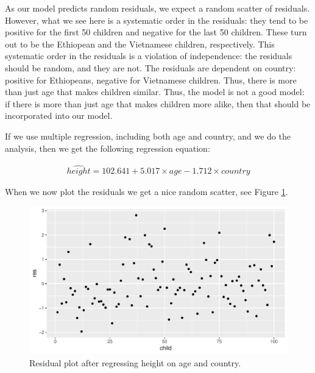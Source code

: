 \documentclass[]{book}\usepackage[]{graphicx}\usepackage[]{color}
\makeatletter
\def\maxwidth{ %
  \ifdim\Gin@nat@width>\linewidth
    \linewidth
  \else
    \Gin@nat@width
  \fi
}
\newenvironment{knitrout}{}{} %
\makeatother
\begin{document}
As our model predicts random residuals, we expect a random scatter of residuals. However, what we see here is a systematic order in the residuals: they tend to be positive for the first 50 children and negative for the last 50 children. These turn out to be the Ethiopean and the Vietnamese children, respectively. This systematic order in the residuals is a violation of independence: the residuals should be random, and they are not. The residuals are dependent on country: positive for Ethiopeans, negative for Vietnamese children. Thus, there is more than just age that makes children similar. Thus, the model is not a good model: if there is more than just age that makes children more alike, then that should be incorporated into our model. 

If we use multiple regression, including both age and country, and we do the analysis, then we get the following regression equation:



\begin{eqnarray}
\widehat{height} = 102.641 + 5.017 \times age - 1.712 \times country 
\end{eqnarray}

When we now plot the residuals we get a nice random scatter, see Figure \ref{fig:ass_7}.

\begin{knitrout}
\color{fgcolor}\begin{figure}

{\centering \includegraphics[width=\maxwidth]{figure/ass_7-1} 

}

\caption[Residual plot after regressing height on age and country]{Residual plot after regressing height on age and country.}\label{fig:ass_7}
\end{figure}


\end{knitrout}
\end{document}

